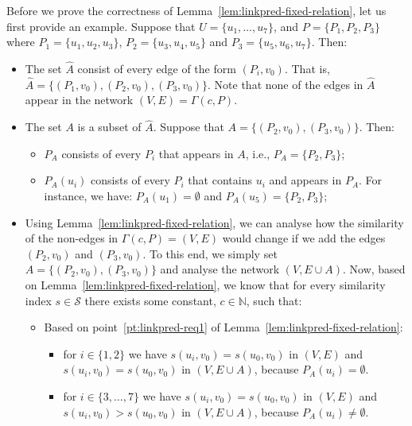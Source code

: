 \documentclass[twocolumn]{article}
\newcommand{\N}{\mathbb{N}}
\newcommand{\FA}{\widehat{A}}
\newcommand{\PA}{P_{A}}
\begin{document}
\noindent Before we prove the correctness of Lemma~\ref{lem:linkpred-fixed-relation}, let us first provide an example. Suppose that $U=\{u_1, \ldots, u_7\}$, and $P=\{P_1, P_2, P_3\}$ where $P_1=\{u_1,u_2,u_3\}$, $P_2=\{u_3,u_4,u_5\}$ and $P_3=\{u_5,u_6,u_7\}$. Then:
\begin{itemize}
%
\item The set $\FA$ consist of every edge of the form $(P_i,v_0)$. That is, $\FA=\{(P_1,v_0), (P_2,v_0), (P_3,v_0)\}$. Note that none of the edges in $\FA$ appear in the network $(V,E)=\Gamma(c,P)$.
%
\item The set $A$ is a subset of $\FA$. Suppose that $A=\{(P_2,v_0),(P_3,v_0)\}$. Then:
    \begin{itemize}
    \item $\PA$ consists of every $P_i$ that appears in $A$, i.e., $\PA=\{P_2,P_3\}$;
    \item $\PA(u_i)$ consists of every $P_i$ that contains $u_i$ and appears in $\PA$. For instance, we have: $\PA(u_1) = \emptyset$ and $\PA(u_5) = \{P_2,P_3\}$;
    \end{itemize}
%
\item Using Lemma~\ref{lem:linkpred-fixed-relation}, we can analyse how the similarity of the non-edges in $\Gamma(c,P)=(V,E)$ would change if we add the edges $(P_2,v_0)$ and $(P_3,v_0)$. To this end, we simply set $A=\{(P_2,v_0),(P_3,v_0)\}$ and analyse the network $(V,E \cup A)$. Now, based on Lemma~\ref{lem:linkpred-fixed-relation}, we know that for every similarity index $s\in\mathcal{S}$ there exists some constant, $c \in \N$, such that:
    \begin{itemize}
    \item Based on point~\ref{pt:linkpred-req1} of Lemma~\ref{lem:linkpred-fixed-relation}:
        \begin{itemize}
        \item for $i\in\{1,2\}$ we have $s(u_i,v_0)=s(u_0,v_0)$ in $(V,E)$ and $s(u_i,v_0)=s(u_0,v_0)$ in $(V,E\cup A)$, because $\PA(u_i) = \emptyset$. 
        \item for $i\in\{3,\ldots,7\}$ we have $s(u_i,v_0)=s(u_0,v_0)$ in $(V,E)$ and $s(u_i,v_0)>s(u_0,v_0)$ in $(V,E\cup A)$, because $\PA(u_i) \neq\emptyset$.
        \end{itemize}

\end{itemize}
\end{itemize}
\end{document}
